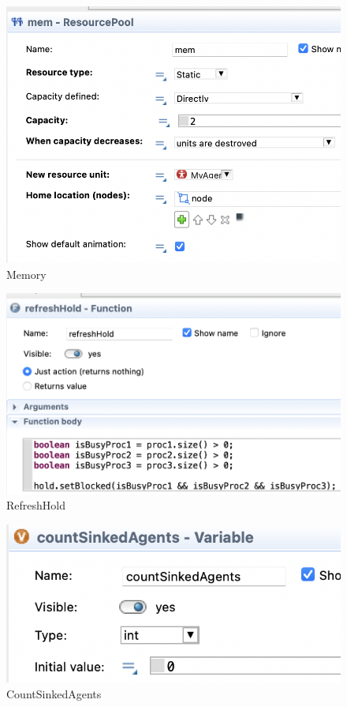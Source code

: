 \documentclass[14pt, a4paper, titlepage]{extarticle}
\begin{document}
	\begin{figure}[H]
		\centering
		\includegraphics[width=.9\textwidth]{mem}
		\caption{Memory}
	\end{figure}
	
	\begin{figure}[H]
		\centering
		\includegraphics[width=.9\textwidth]{refreshHold}
		\caption{RefreshHold}
	\end{figure}

	\begin{figure}[H]
		\centering
		\includegraphics[width=.9\textwidth]{countSinkedAgents}
		\caption{CountSinkedAgents}
	\end{figure}
\end{document}
